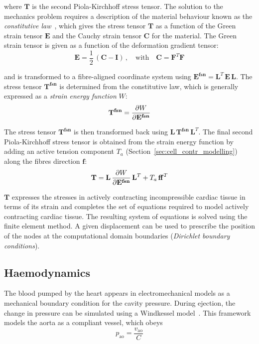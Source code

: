\noindent
where $\mathbf{T}$ is the second Piola-Kirchhoff stress tensor. The solution to the mechanics problem requires a description of the material behaviour known as the \textit{constitutive law}~\cite{BonetWood:2008}, which gives the stress tensor $\mathbf{T}$ as a function of the Green strain tensor $\mathbf{E}$ and the Cauchy strain tensor $\mathbf{C}$ for the material. The Green strain tensor is given as a function of the deformation gradient tensor:
%
\begin{equation}
    \mathbf{E} = \frac{1}{2}\,(\mathbf{C}-\mathbf{I})\,,\quad\text{with}\quad \mathbf{C}=\mathbf{F}^T\mathbf{F}
\end{equation}

\noindent
and is transformed to a fibre-aligned coordinate system using $\mathbf{E^{fsn}}=\mathbf{L}^T\,\mathbf{E}\,\mathbf{L}$. The stress tensor $\mathbf{T^{fsn}}$ is determined from the constitutive law, which is generally expressed as a \textit{strain energy function} $W$:
%
\begin{equation}
    \mathbf{T^{fsn}} = \dfrac{\partial {W}}{\partial {\mathbf{E^{fsn}}}}
\end{equation}

\noindent
The stress tensor $\mathbf{T^{fsn}}$ is then transformed back using $\mathbf{L}\,\mathbf{T^{fsn}}\,\mathbf{L}^T$. The final second Piola-Kirchhoff stress tensor is obtained from the strain energy function by adding an active tension component $T_a$ (Section~\ref{sec:cell_contr_modelling}) along the fibres direction $\mathbf{f}$:
%
\begin{equation}\label{eq:eqce}
    \mathbf{T} = \mathbf{L}\,\dfrac{\partial {W}}{\partial {\mathbf{E^{fsn}}}}\,\mathbf{L}^T + T_a\,\mathbf{ff}^T
\end{equation}

\noindent
$\mathbf{T}$ expresses the stresses in actively contracting incompressible cardiac tissue in terms of its strain and completes the set of equations required to model actively contracting cardiac tissue. The resulting system of equations is solved using the finite element method. A given displacement can be used to prescribe the position of the nodes at the computational domain boundaries (\textit{Dirichlet boundary conditions}).


%
%
%
\subsection{Haemodynamics}\label{sec:hemodynamics_math_modelling}
The blood pumped by the heart appears in electromechanical models as a mechanical boundary condition for the cavity pressure. During ejection, the change in pressure can be simulated using a Windkessel model~\cite{Westerhof:1971}. This framework models the aorta as a compliant vessel, which obeys
%
\begin{equation}\label{eq:firstwkelem}
    p_{\textrm{ao}} = \frac{v_{\textrm{ao}}}{C}
\end{equation}

